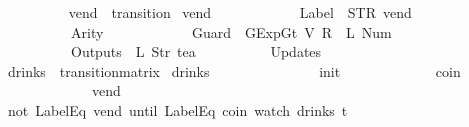\begin{isabellebody}
{\ \ \ \ \ \ \ \ {\isasymrparr}{\isachardoublequoteclose}\isanewline
\isanewline
{}\isamarkupfalse%
\ vend\ {\isacharcolon}{\isacharcolon}\ transition\ \isanewline
{\isachardoublequoteopen}vend\ {\isasymequiv}\ {\isasymlparr}\isanewline
\ \ \ \ \ \ \ \ \ \ Label\ {\isacharequal}\ {\isacharparenleft}STR\ {\isacharprime}{\isacharprime}vend{\isacharprime}{\isacharprime}{\isacharparenright}{\isacharcomma}\isanewline
\ \ \ \ \ \ \ \ \ \ Arity\ {\isacharequal}\ {}{\isacharcomma}\isanewline
\ \ \ \ \ \ \ \ \ \ Guard\ {\isacharequal}\ {\isacharbrackleft}GExp{\isachardot}Gt\ {\isacharparenleft}V\ {\isacharparenleft}R\ {}{\isacharparenright}{\isacharparenright}\ {\isacharparenleft}L\ {\isacharparenleft}Num\ {}{\isacharparenright}{\isacharparenright}{\isacharbrackright}{\isacharcomma}\isanewline
\ \ \ \ \ \ \ \ \ \ Outputs\ {\isacharequal}\ {\isacharbrackleft}L\ {\isacharparenleft}Str\ {\isacharprime}{\isacharprime}tea{\isacharprime}{\isacharprime}{\isacharparenright}{\isacharbrackright}{\isacharcomma}\isanewline
\ \ \ \ \ \ \ \ \ \ Updates\ {\isacharequal}\ {\isacharbrackleft}{\isacharbrackright}\isanewline
\ \ \ \ \ \ \ \ {\isasymrparr}{\isachardoublequoteclose}\isanewline
\isanewline
{}\isamarkupfalse%
\ drinks\ {\isacharcolon}{\isacharcolon}\ {\isachardoublequoteopen}transition{\isacharunderscore}matrix{\isachardoublequoteclose}\ \isanewline
{\isachardoublequoteopen}drinks\ {\isasymequiv}\ {\isacharbraceleft}{\isacharbar}\isanewline
\ \ \ \ \ \ \ \ \ \ \ \ {\isacharparenleft}{\isacharparenleft}{}{\isacharcomma}{}{\isacharparenright}{\isacharcomma}\ init{\isacharparenright}{\isacharcomma}\isanewline
\ \ \ \ \ \ \ \ \ \ \ \ {\isacharparenleft}{\isacharparenleft}{}{\isacharcomma}{}{\isacharparenright}{\isacharcomma}\ coin{\isacharparenright}{\isacharcomma}\isanewline
\ \ \ \ \ \ \ \ \ \ \ \ {\isacharparenleft}{\isacharparenleft}{}{\isacharcomma}{}{\isacharparenright}{\isacharcomma}\ vend{\isacharparenright}\isanewline
\ \ \ \ \ \ \ \ \ \ {\isacharbar}{\isacharbraceright}{\isachardoublequoteclose}%
}%
\isamarkupfalse%
\ {\isachardoublequoteopen}{\isacharparenleft}not\ {\isacharparenleft}LabelEq\ {\isacharprime}{\isacharprime}vend{\isacharprime}{\isacharprime}{\isacharparenright}\ until\ {\isacharparenleft}LabelEq\ {\isacharprime}{\isacharprime}coin{\isacharprime}{\isacharprime}{\isacharparenright}{\isacharparenright}\ {\isacharparenleft}watch\ drinks\ t{\isacharparenright}{\isachardoublequoteclose}\isanewline

\end{isabellebody}
